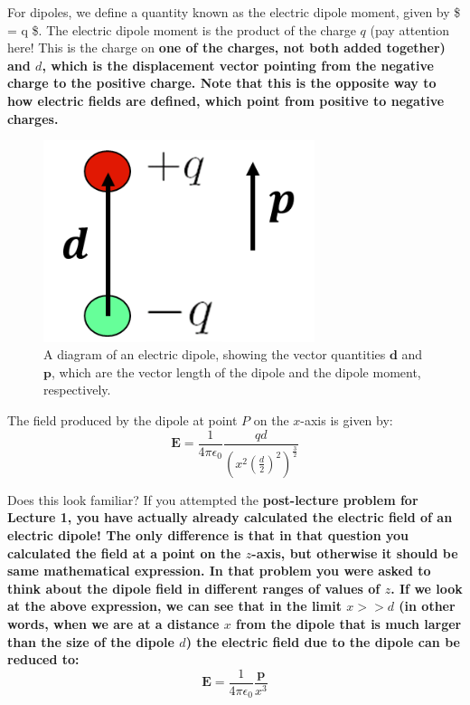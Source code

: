 \documentclass[
  letterpaper,
  DIV=11,
  numbers=noendperiod]{scrreprt}
\begin{document}
For dipoles, we define a quantity known as the electric dipole moment,
given by \$ = q  \$. The electric
dipole moment is the product of the charge \(q\) (pay attention here!
This is the charge on
\bf{one of} the charges, not both added together) and $d$, which is the displacement vector pointing from the negative charge to the positive charge. Note that this is the opposite way to how electric fields are defined, which point from positive to negative charges.  

\begin{figure}[H]

{\centering \includegraphics[width=3.125in,height=\textheight]{Figures/dipole_moment.png}

}

\caption{A diagram of an electric dipole, showing the vector quantities
\(\mathrm{\mathbf{d}}\) and \(\mathrm{\mathbf{p}}\), which are the
vector length of the dipole and the dipole moment, respectively.}

\end{figure}%

The field produced by the dipole at point \(P\) on the \(x\)-axis is
given by: \[
\mathrm{\mathbf{E}}= \frac{1}{4\pi \epsilon_0} \frac{qd}{ \left( x^2 \left( \frac{d}{2} \right)^2 \right)^{\frac{3}{2}} }
\]

Does this look familiar? If you attempted the
\bf{post-lecture problem for Lecture 1}, you have actually already calculated the electric field of an electric dipole! The only difference is that in that question you calculated the field at a point on the $z$-axis, but otherwise it should be same mathematical expression. In that problem you were asked to think about the dipole field in different ranges of values of $z$. If we look at the above expression, we can see that in the limit $x >> d$ (in other words, when we are at a distance $x$ from the dipole that is much larger than the size of the dipole $d$) the electric field due to the dipole can be reduced to:
$$
\mathrm{\mathbf{E}}= \frac{1}{4 \pi \epsilon_0} \frac{\mathrm{\mathbf{p}}}{x^3}
$$ 
\end{document}
